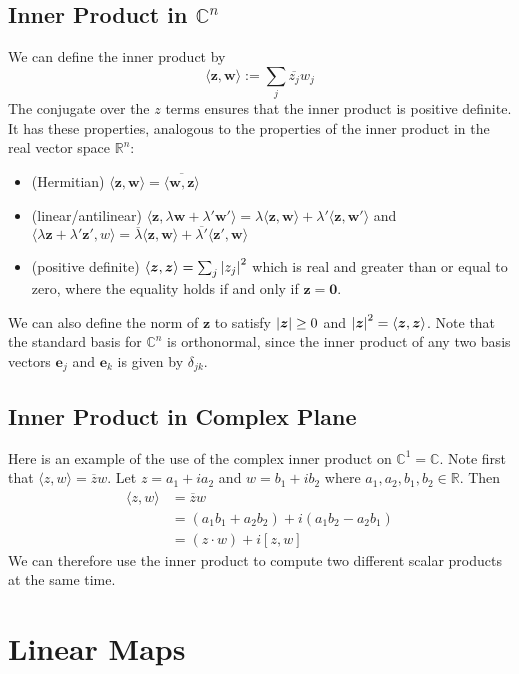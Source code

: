 \documentclass{article}
\begin{document}
	\subsection{Inner Product in $\mathbb C^n$}
	We can define the inner product by
	\[ \langle \bm z, \bm w \rangle := \sum_j \overline{z_j} w_j \]
	The conjugate over the $z$ terms ensures that the inner product is positive definite. It has these properties, analogous to the properties of the inner product in the real vector space $\mathbb R^n$:
	\begin{itemize}
		\item (Hermitian) $\langle \bm z, \bm w \rangle = \overline{\langle \bm w, \bm z \rangle}$
		\item (linear/antilinear) $\langle \bm z, \lambda \bm w + \lambda' \bm w' \rangle = \lambda \langle \bm z, \bm w \rangle + \lambda' \langle \bm z, \bm w' \rangle$ and $\langle \lambda \bm z + \lambda' \bm z', w \rangle = \overline{\lambda} \langle \bm z, \bm w \rangle + \overline{\lambda'} \langle \bm z', \bm w \rangle$
		\item (positive definite) $\langle \bm z, \bm z \rangle = \sum_j \abs{z_j}^2$ which is real and greater than or equal to zero, where the equality holds if and only if $\bm z = \bm 0$.
	\end{itemize}
	We can also define the norm of $\bm z$ to satisfy $\abs{\bm z} \geq 0$ and $\abs{\bm z}^2 = \langle \bm z, \bm z \rangle$. Note that the standard basis for $\mathbb C^n$ is orthonormal, since the inner product of any two basis vectors $\bm e_j$ and $\bm e_k$ is given by $\delta_{jk}$.
	
	\subsection{Inner Product in Complex Plane}
	Here is an example of the use of the complex inner product on $\mathbb C^1 = \mathbb C$. Note first that $\langle z, w \rangle = \overline z w$. Let $z = a_1 + ia_2$ and $w = b_1 + ib_2$ where $a_1, a_2, b_1, b_2 \in \mathbb R$. Then
	\begin{align*}
		\langle z, w \rangle &= \overline z w \\
		&= (a_1 b_1 + a_2 b_2) + i(a_1 b_2 - a_2 b_1) \\
		&= (z \cdot w) + i[z, w]
	\end{align*}
	We can therefore use the inner product to compute two different scalar products at the same time.

	\section{Linear Maps}
\end{document}
